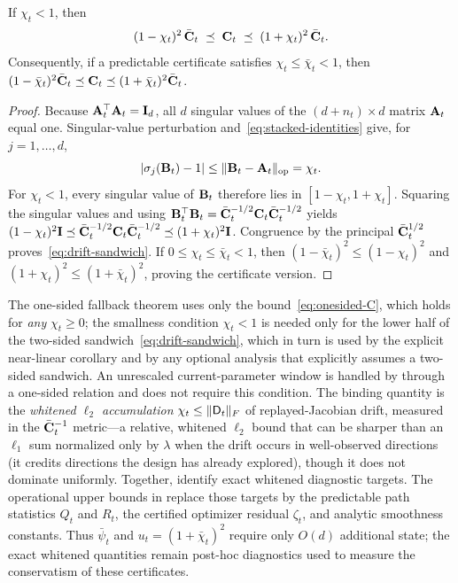 \begin{corollary}\label{cor:drift-sandwich}
If $\chi_t<1$, then
\begin{equation}\label{eq:drift-sandwich}
  (1-\chi_t)^2\,\bar{\mathbf{C}}_t
  \;\preceq\;
  \mathbf{C}_t
  \;\preceq\;
  (1+\chi_t)^2\,\bar{\mathbf{C}}_t .
\end{equation}
Consequently, if a predictable certificate satisfies
$\chi_t\le\bar\chi_t<1$, then
$(1-\bar\chi_t)^2\bar{\mathbf{C}}_t\preceq\mathbf{C}_t
\preceq(1+\bar\chi_t)^2\bar{\mathbf{C}}_t$.
\end{corollary}
\begin{proof}
Because $\mathbf{A}_t^\top\mathbf{A}_t=\mathbf{I}_d$, all $d$ singular values of the
$(d+n_t)\times d$ matrix $\mathbf{A}_t$ equal one.  Singular-value perturbation
and~\eqref{eq:stacked-identities} give, for $j=1,\ldots,d$,
\[
 |\sigma_j(\mathbf{B}_t)-1|
 \le\|\mathbf{B}_t-\mathbf{A}_t\|_{\rm op}=\chi_t.
\]
For $\chi_t<1$, every singular value of $\mathbf{B}_t$ therefore lies in
$[1-\chi_t,1+\chi_t]$.  Squaring the singular values and using
$\mathbf{B}_t^\top\mathbf{B}_t=\bar{\mathbf{C}}_t^{-1/2}\mathbf{C}_t\bar{\mathbf{C}}_t^{-1/2}$ yields
$(1-\chi_t)^2\mathbf{I}\preceq
\bar{\mathbf{C}}_t^{-1/2}\mathbf{C}_t\bar{\mathbf{C}}_t^{-1/2}
\preceq(1+\chi_t)^2\mathbf{I}$.  Congruence by the principal
$\bar{\mathbf{C}}_t^{1/2}$ proves~\eqref{eq:drift-sandwich}.
If $0\le\chi_t\le\bar\chi_t<1$, then
$(1-\bar\chi_t)^2\le(1-\chi_t)^2$ and
$(1+\chi_t)^2\le(1+\bar\chi_t)^2$, proving the certificate version.
\end{proof}

The one-sided fallback theorem uses only the bound~\eqref{eq:onesided-C}, which
holds for \emph{any} $\chi_t\ge0$; the smallness condition
$\chi_t<1$ is needed only for the lower half of the two-sided
sandwich~\eqref{eq:drift-sandwich}, which in turn is used by the explicit
near-linear corollary and by any optional analysis that
explicitly assumes a two-sided sandwich.  An unrescaled current-parameter window is
handled by  through a one-sided relation and does not require this
condition.
The binding quantity is the \emph{whitened $\ell_2$ accumulation}
$\chi_t\le\|\mathsf{D}_t\|_F$ of replayed-Jacobian drift, measured in the
$\bar{\mathbf{C}}_t^{-1}$ metric---a relative, whitened $\ell_2$ bound that can be sharper
than an $\ell_1$ sum normalized only by $\lambda$ when the drift occurs in
well-observed directions (it credits directions the design has already
explored), though it does not dominate uniformly.  Together,
 identify exact whitened diagnostic
targets.  The operational upper bounds in  replace
those targets by the predictable path statistics $Q_t$ and $R_t$, the certified
optimizer residual $\zeta_t$, and analytic smoothness constants.  Thus
$\bar\psi_t$ and $u_t=(1+\bar\chi_t)^2$ require only $O(d)$ additional state;
the exact whitened quantities remain post-hoc diagnostics used to measure the
conservatism of these certificates.

